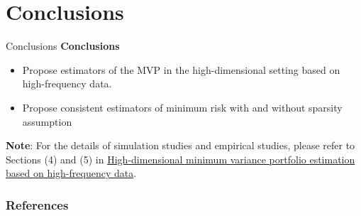 \documentclass{beamer}
\begin{document}
\section{Conclusions}

\begin{frame}{Conclusions}
\textbf{Conclusions}
\begin{itemize}
    \item Propose estimators of the MVP in the high-dimensional setting based on high-frequency data.
    \item Propose consistent estimators of minimum risk with and without sparsity assumption
\end{itemize}

\textbf{Note}: For the details of simulation studies and empirical studies, please refer to Sections (4) and (5) in \href{https://www.sciencedirect.com/science/article/pii/S0304407619301630}{High-dimensional minimum variance portfolio estimation based on high-frequency data}.
\end{frame}


 
\begin{frame}[t,allowframebreaks]
  \frametitle{References}
  \printbibliography
 \end{frame}
 
\end{document}
